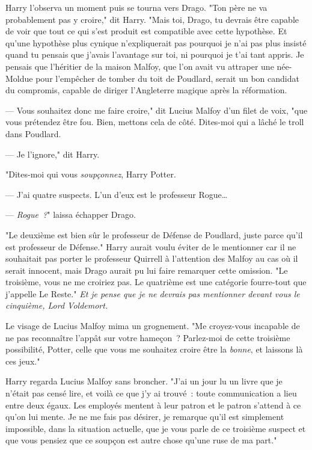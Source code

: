 Harry l'observa un moment puis se tourna vers Drago. "Ton père ne va probablement pas y croire," dit Harry. "Mais toi, Drago, tu devrais être capable de voir que tout ce qui s'est produit est compatible avec cette hypothèse. Et qu'une hypothèse plus cynique n'expliquerait pas pourquoi je n'ai pas plus insisté quand tu pensais que j'avais l'avantage sur toi, ni pourquoi je t'ai tant appris. Je pensais que l'héritier de la maison Malfoy, que l'on avait vu attraper une née-Moldue pour l'empêcher de tomber du toit de Poudlard, serait un bon candidat du compromis, capable de diriger l'Angleterre magique après la réformation.

--- Vous souhaitez donc me faire croire," dit Lucius Malfoy d'un filet de voix, "que vous prétendez être fou. Bien, mettons cela de côté. Dites-moi qui a lâché le troll dans Poudlard.

--- Je l'ignore," dit Harry.

"Dites-moi qui vous \emph{soupçonnez}, Harry Potter.

--- J'ai quatre suspects. L'un d'eux est le professeur Rogue…

--- \emph{Rogue~?}" laissa échapper Drago.

"Le deuxième est bien sûr le professeur de Défense de Poudlard, juste parce qu'il est professeur de Défense." Harry aurait voulu éviter de le mentionner car il ne souhaitait pas porter le professeur Quirrell à l'attention des Malfoy au cas où il serait innocent, mais Drago aurait pu lui faire remarquer cette omission. "Le troisième, vous ne me croiriez pas. Le quatrième est une catégorie fourre-tout que j'appelle Le Reste." \emph{Et je pense que je ne devrais pas mentionner devant vous le cinquième, Lord Voldemort.}

Le visage de Lucius Malfoy mima un grognement. "Me croyez-vous incapable de ne pas reconnaître l'appât sur votre hameçon~? Parlez-moi de cette troisième possibilité, Potter, celle que vous me souhaitez croire être la \emph{bonne}, et laissons là ces jeux."

Harry regarda Lucius Malfoy sans broncher. "J'ai un jour lu un livre que je n'était pas censé lire, et voilà ce que j'y ai trouvé~: toute communication a lieu entre deux égaux. Les employés mentent à leur patron et le patron s'attend à ce qu'on lui mente. Je ne me fais pas désirer, je remarque qu'il est simplement impossible, dans la situation actuelle, que je vous parle de ce troisième suspect et que vous pensiez que ce soupçon est autre chose qu'une ruse de ma part."

